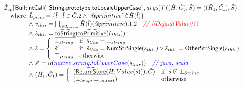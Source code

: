 \[\begin{array}{l}
\hat{\mathcal{I}} _{cp}\llbracket \mbox{\textsf{BuiltintCall}}(``\mbox{\textsf{String.prototype.toLocaleUpperCase}}",args))\rrbracket((\hat{H},\hat{C}), \hat{S})
  = ((\hat{H}_1, \hat{C_1}), \hat{S})\\
\quad{\rm where}\begin{array}[t]{l} 
  \hat{L}_{prim} = \{ \hat{l} \mid \hat{l} \in \hat{C}.2 \land ``\hat{@primitive}" \dot{\in}\hat{H}(\hat{l}) \}\\
  \land\ \hat{v}_{this} = \bigsqcup_{\hat{l} \in \hat{L}_{prim}} \hat{H}(\hat{l})(\hat{@primitive}).1.2
    \quad\textit{{\color{red}// [[DefaultValue]]??}}\\
  \land\ \hat{s}_{this} = \widehat{\underline{\sf toString}}(\widehat{\underline{\sf toPrimitive}}(\hat{v}_{this}))\\
  \land\ \hat{s} = \left\{\begin{array}{ll}
      \bot_{string} & {\rm if}\begin{array}[t]{l}\hat{s}_{this} = \bot_{string}\end{array}\\
      \hat{s}' & {\rm if}\begin{array}[t]{l}\hat{s}_{this} = \mbox{\textsf{NumStrSingle}}(s_{this}) \lor \hat{s}_{this} = \mbox{\textsf{OtherStrSingle}}(s_{this}) \end{array}\\
      \top_{string} & {\rm otherwise}
    \end{array}\right.\\
  \land\ \hat{s}' = \alpha({\color{blue} native.string.toUpperCase}(s_{this}))
    \quad\textit{{\color{blue}// java, scala}}\\  
  \land\ (\hat{H}_1, \hat{C}_1) = 
    \left\{\begin{array}{ll}
      (\widehat{\underline{\sf ReturnStore}}(\hat{H}, Value(\hat{s}))), \hat{C})
      & {\rm if}\begin{array}[t]{l}\hat{s} \not\sqsubseteq \bot_{String}\end{array}\\
      (\bot_{heap}, \bot_{context}) & {\rm otherwise} \\
    \end{array}\right.\\
  \end{array}\\
\\\\



\end{array}\]
